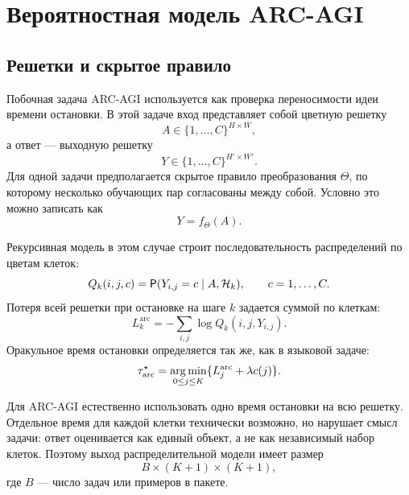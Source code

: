 \section{Вероятностная модель ARC-AGI}

\subsection{Решетки и скрытое правило}

Побочная задача ARC-AGI \cite{arcagi,chollet2019} используется как проверка переносимости идеи времени остановки. В этой задаче вход представляет
собой цветную решетку
\begin{equation}
  A\in\{1,\ldots,C\}^{H\times W},
\end{equation}
а ответ --- выходную решетку
\begin{equation}
  Y\in\{1,\ldots,C\}^{H'\times W'}.
\end{equation}
Для одной задачи предполагается скрытое правило преобразования \(\Theta\), по которому несколько
обучающих пар согласованы между собой. Условно это можно записать как
\begin{equation}
  Y=f_{\Theta}(A).
  \label{eq:arc_rule}
\end{equation}

Рекурсивная модель в этом случае строит последовательность распределений по цветам клеток:
\begin{equation}
  Q_k(i,j,c)=\mathsf{P}(Y_{i,j}=c\mid A,\mathcal{H}_k), \qquad c=1,\ldots,C.
  \label{eq:arc_cell_distribution}
\end{equation}
Потеря всей решетки при остановке на шаге \(k\) задается суммой по клеткам:
\begin{equation}
  L_k^{\mathrm{arc}}=-\sum_{i,j}\log Q_k(i,j,Y_{i,j}).
  \label{eq:arc_loss}
\end{equation}
Оракульное время остановки определяется так же, как в языковой задаче:
\begin{equation}
  \tau_{\mathrm{arc}}^\star=\operatorname*{arg\,min}_{0\le j\le K}\{L_j^{\mathrm{arc}}+\lambda c(j)\}.
  \label{eq:arc_tau}
\end{equation}

Для ARC-AGI естественно использовать одно время остановки на всю решетку. Отдельное время для
каждой клетки технически возможно, но нарушает смысл задачи: ответ оценивается как единый объект,
а не как независимый набор клеток. Поэтому выход распределительной модели имеет размер
\begin{equation}
  B\times (K+1)\times (K+1),
  \label{eq:arc_output_size}
\end{equation}
где \(B\) --- число задач или примеров в пакете.

